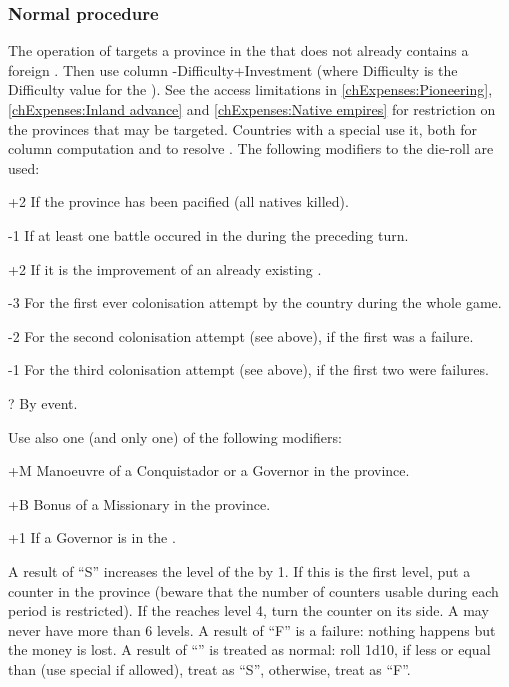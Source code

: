 \subsubsection{Normal procedure}
\aparag[Colonisation] The operation of  targets a province
in the \ROTW that does not already contains a foreign \COL. Then use column
\FTI-Difficulty+Investment (where Difficulty is the Difficulty value for the
\Area).
\bparag See the access limitations in \ref{chExpenses:Pioneering},
\ref{chExpenses:Inland advance} and \ref{chExpenses:Native empires} for
restriction on the provinces that may be targeted.
\bparag Countries with a special \FTI use it, both for column computation and
to resolve \undemi.
\bparag The following modifiers to the die-roll are used:
\begin{modlist}
\item[+2]If the province has been pacified (all natives killed).
\item[-1]If at least one battle occured in the \Area during the preceding
  turn.
\item[+2]If it is the improvement of an already existing \COL.
\item[-3]For the first ever colonisation attempt by the country during the
  whole game.
\item[-2]For the second colonisation attempt (see above), if the first was a
  failure.
\item[-1]For the third colonisation attempt (see above), if the first two were
  failures.
\item[\textplusminus?]By event.
\end{modlist}
\bparag Use also one (and only one) of the following modifiers:
\begin{modlist}
\item[+M]Manoeuvre of a Conquistador or a Governor in the province.
\item[+B]Bonus of a Missionary in the province.
\item[+1]If a Governor is in the \Area.
\end{modlist}

\bparag A result of ``S'' increases the level of the \COL by 1. If this is the
first level, put a counter in the province (beware that the number of counters
usable during each period is restricted). If the \COL reaches level 4, turn
the counter on its \Faceplus side. A \COL may never have more than 6 levels.
\bparag A result of ``F'' is a failure: nothing happens but the money is lost.
\bparag A result of ``\undemi'' is treated as normal: roll 1d10, if less or
equal than \FTI (use special \FTI if allowed), treat as ``S'', otherwise,
treat as ``F''.

